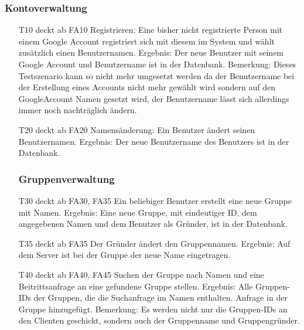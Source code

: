\documentclass{scrartcl}
\begin{document}
\subsubsection{Kontoverwaltung}
\begin{itemize} 
	\item[T10] deckt ab FA10 \newline
	Registrieren: Eine bisher nicht registrierte Person mit einem Google Account registriert sich mit diesem im System und wählt zusätzlich einen Benutzernamen. \newline
	Ergebnis: Der neue Benutzer mit seinem Google Account und Benutzername ist in der Datenbank. \newline
	Bemerkung: Dieses Testszenario kann so nicht mehr umgesetzt werden da der Benutzername bei der Erstellung eines Accounts nicht mehr gewählt wird sondern auf den GoogleAccount Namen gesetzt wird, der Benutzername lässt sich allerdings immer noch nachträglich ändern.
	
	\item[T20] deckt ab FA20\newline
	Namensänderung: Ein Benutzer ändert seinen Benutzernamen. \newline
	Ergebnis: Der neue Benutzername des Benutzers ist in der Datenbank. 
	
	\subsubsection{Gruppenverwaltung}
	
	\item[T30] deckt ab FA30, FA35\newline
	Ein beliebiger Benutzer erstellt eine neue Gruppe mit Namen. \newline
	Ergebnis: Eine neue Gruppe, mit eindeutiger ID, dem angegebenen Namen und dem Benutzer als Gründer, ist in der Datenbank.
	
	\item[T35] deckt ab FA35 \newline
	Der Gründer ändert den Gruppennamen.\newline
	Ergebnis: Auf dem Server ist bei der Gruppe der neue Name eingetragen. 
	
	\item[T40] deckt ab FA40, FA45  \newline
	Suchen der Gruppe nach Namen und eine Beitrittsanfrage an eine gefundene Gruppe stellen. \newline
	Ergebnis: Alle Gruppen-IDs der Gruppen, die die Suchanfrage im Namen enthalten. Anfrage in der Gruppe 		
	hinzugefügt. \newline
	Bemerkung: Es werden nicht nur die Gruppen-IDs an den Clienten geschickt, sondern auch der Gruppenname und Gruppengründer.
	

\end{itemize}
\end{document}
